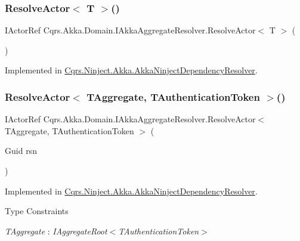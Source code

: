 \subsubsection{\texorpdfstring{Resolve\+Actor$<$ T $>$()}{ResolveActor< T >()}}
{\footnotesize\ttfamily I\+Actor\+Ref Cqrs.\+Akka.\+Domain.\+I\+Akka\+Aggregate\+Resolver.\+Resolve\+Actor$<$ T $>$ (\begin{DoxyParamCaption}{ }\end{DoxyParamCaption})}



Implemented in \hyperlink{classCqrs_1_1Ninject_1_1Akka_1_1AkkaNinjectDependencyResolver_a6c3399c949a77457456d77688eb66054}{Cqrs.\+Ninject.\+Akka.\+Akka\+Ninject\+Dependency\+Resolver}.

\mbox{\label{interfaceCqrs_1_1Akka_1_1Domain_1_1IAkkaAggregateResolver_a59dbc788ce9893d72684ff5c18945c1d}} 
\subsubsection{\texorpdfstring{Resolve\+Actor$<$ T\+Aggregate, T\+Authentication\+Token $>$()}{ResolveActor< TAggregate, TAuthenticationToken >()}}
{\footnotesize\ttfamily I\+Actor\+Ref Cqrs.\+Akka.\+Domain.\+I\+Akka\+Aggregate\+Resolver.\+Resolve\+Actor$<$ T\+Aggregate, T\+Authentication\+Token $>$ (\begin{DoxyParamCaption}\item[{Guid}]{rsn }\end{DoxyParamCaption})}



Implemented in \hyperlink{classCqrs_1_1Ninject_1_1Akka_1_1AkkaNinjectDependencyResolver_ab5ba20875aab8764bbb7d6df61722436}{Cqrs.\+Ninject.\+Akka.\+Akka\+Ninject\+Dependency\+Resolver}.

\begin{Desc}
\item[Type Constraints]\begin{description}
\item[{\em T\+Aggregate} : {\em I\+Aggregate\+Root$<$T\+Authentication\+Token$>$}]\end{description}
\end{Desc}
